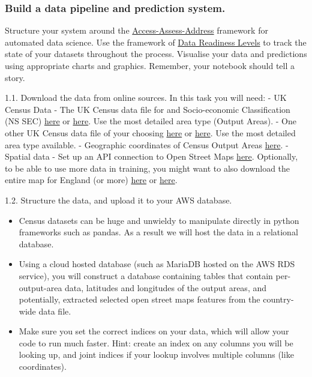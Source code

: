 \documentclass[11pt]{article}
\begin{document}
    \subsubsection{Build a data pipeline and prediction
system.}\label{build-a-data-pipeline-and-prediction-system.}

Structure your system around the
\href{https://inverseprobability.com/talks/notes/access-assess-address-a-pipeline-for-automated-data-science.html}{Access-Assess-Address}
framework for automated data science. Use the framework of
\href{https://inverseprobability.com/publications/data-readiness-levels.html}{Data
Readiness Levels} to track the state of your datasets throughout the
process. Visualise your data and predictions using appropriate charts
and graphics. Remember, your notebook should tell a story.

1.1. Download the data from online sources. In this task you will need:
- UK Census Data - The UK Census data file for and Socio-economic
Classification (NS SEC)
\href{https://www.ons.gov.uk/datasets/TS062/editions/2021/versions/5}{here}
or \href{https://www.nomisweb.co.uk/sources/census_2021_bulk}{here}. Use
the most detailed area type (Output Areas). - One other UK Census data
file of your choosing
\href{https://www.ons.gov.uk/search?topics=9731,6646,3845,9497,4262,4128,7755,4994,6885,9724,7367&filter=datasets}{here}
or \href{https://www.nomisweb.co.uk/sources/census_2021_bulk}{here}. Use
the most detailed area type available. - Geographic coordinates of
Census Output Areas
\href{https://www.data.gov.uk/dataset/4d4e021d-fe98-4a0e-88e2-3ead84538537/output-areas-december-2021-boundaries-ew-bgc-v2}{here}.
- Spatial data - Set up an API connection to Open Street Maps
\href{https://osmnx.readthedocs.io/en/stable/}{here}. Optionally, to be
able to use more data in training, you might want to also download the
entire map for England (or more)
\href{https://download.openstreetmap.fr/extracts/}{here} or
\href{https://wiki.openstreetmap.org/wiki/Planet.osm}{here}.

1.2. Structure the data, and upload it to your AWS database.

\begin{itemize}
\item
  Census datasets can be huge and unwieldy to manipulate directly in
  python frameworks such as pandas. As a result we will host the data in
  a relational database.
\item
  Using a cloud hosted database (such as MariaDB hosted on the AWS RDS
  service), you will construct a database containing tables that contain
  per-output-area data, latitudes and longitudes of the output areas,
  and potentially, extracted selected open street maps features from the
  country-wide data file.
\item
  Make sure you set the correct indices on your data, which will allow
  your code to run much faster. Hint: create an index on any columns you
  will be looking up, and joint indices if your lookup involves multiple
  columns (like coordinates).
\end{itemize}
\end{document}
